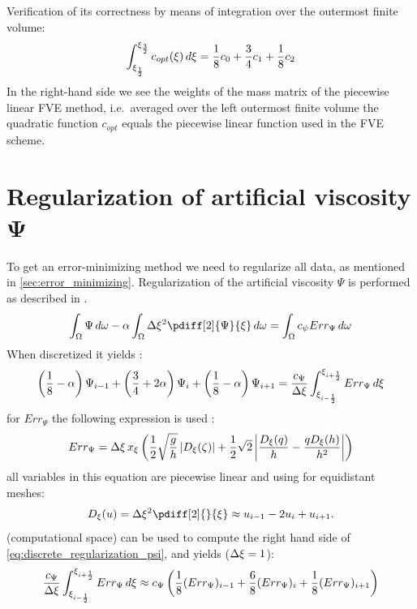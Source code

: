 Verification of its correctness by means of integration over the outermost finite volume:
\begin{align}
\int_{\xi_{\frac{1}{2}}}^{\xi_{\frac{3}{2}}} c_{opt}(\xi)\, d\xi = \frac{1}{8} c_0 + \frac{3}{4} c_1 + \frac{1}{8} c_2
\end{align}
In the right-hand side we see the weights of the mass matrix of the piecewise linear FVE
method, i.e.\ averaged over the left outermost finite volume the quadratic function $c_{opt}$
equals the piecewise linear function used in the FVE scheme.
\section{Regularization of artificial viscosity $\mathbf{\Psi}$}
To get an error-minimizing method we need to regularize all data, as mentioned in \autoref{sec:error_minimizing}.
Regularization of the artificial viscosity $\Psi$ is performed as described in \citet[eq.\ 14]{Borsboom2001}.
\begin{align}
	\int_\Omega \Psi\, d\omega - \alpha \int_\Omega \Dxi^2 \pdiff[2]{\Psi}{\xi}\, d\omega = \int_\Omega c_{\psi} Err_\Psi\, d\omega
\end{align}
When discretized it yields \citep[eq.\ 18]{Borsboom2001}:
\begin{align}
	\left(\frac{1}{8} - \alpha \right)\Psi_{i-1} + 
	\left(\frac{3}{4} + 2\alpha \right)\Psi_{i} + 
	\left(\frac{1}{8} - \alpha \right)\Psi_{i+1} = \frac{c_{\Psi}}{\Delta \xi} \int^{\xi_{i+\frac{1}{2}}}_{\xi_{i-\frac{1}{2}}} Err_{\Psi}\, d\xi
	\label{eq:discrete_regularization_psi}
\end{align}
for $Err_\Psi$ the following expression is used \citep[eq.\ 42]{Borsboom2001}:
\begin{align}
	Err_\Psi = \Delta \xi\, x_\xi \left( \frac{1}{2} \sqrt{\frac{g}{h}} \left| D_\xi(\zeta) \right| + 
	\frac{1}{2} \sqrt{2} \left| \frac{D_\xi(q)}{h} - \frac{qD_\xi(h)}{h^2} \right| \right)
\end{align}
all variables in this equation are piecewise linear and using \citet[eq.\ 35]{Borsboom2001} for equidistant meshes:
\begin{align}
	D_\xi(u) = \Dxi^2 \pdiff[2]{}{\xi} \approx u_{i-1} - 2 u_{i} + u_{i+1}.
\end{align}
 (computational space) can be used to compute the right hand side of \autoref{eq:discrete_regularization_psi}, and yields ($\Delta \xi=1$):
\begin{align}
	\frac{c_{\Psi}}{\Delta \xi} \int^{\xi_{i+\frac{1}{2}}}_{\xi_{i-\frac{1}{2}}} Err_{\Psi}\, d\xi 
	\approx
	c_{\Psi} \left( \frac{1}{8} (Err_{\Psi})_{i-1}+ \frac{6}{8}  (Err_{\Psi})_{i} + \frac{1}{8}   (Err_{\Psi})_{i+1} \right)
\end{align}



